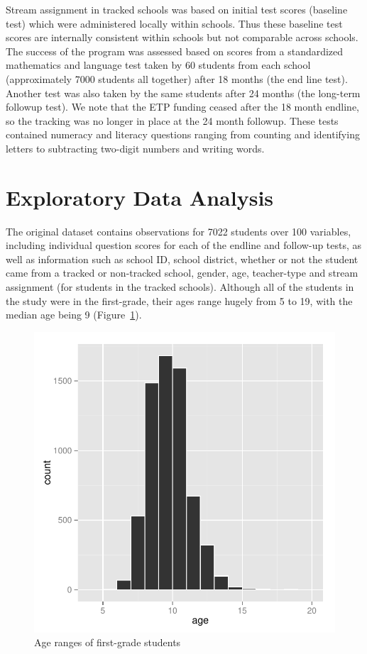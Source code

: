 \documentclass[11pt]{article}
\begin{document}
Stream assignment in tracked schools was based on initial test scores (baseline test) which were administered locally within schools. Thus these baseline test scores are internally consistent within schools but not comparable across schools. The success of the program was assessed based on scores from a standardized mathematics and language test taken by 60 students from each school (approximately 7000 students all together) after 18 months (the end line test). Another test was also taken by the same students after 24 months (the long-term followup test). We note that the ETP funding ceased after the 18 month endline, so the tracking was no longer in place at the 24 month followup. These tests contained numeracy and literacy questions ranging from counting and identifying letters to subtracting two-digit numbers and writing words.
 
 \section{Exploratory Data Analysis}
 The original dataset contains observations for 7022 students over 100 variables, including individual question scores for each of the endline and follow-up tests, as well as information such as school ID, school district, whether or not the student came from a tracked or non-tracked school, gender, age, teacher-type and stream assignment (for students in the tracked schools). Although all of the students in the study were in the first-grade, their ages range hugely from 5 to 19, with the median age being 9 (Figure~\ref{fig:age}).
 
  \begin{figure}[h]
 \centering
 \includegraphics[scale=0.6]{age.pdf}
 \caption{Age ranges of first-grade students}
 \label{fig:age}
 \end{figure} 
 
\end{document}
